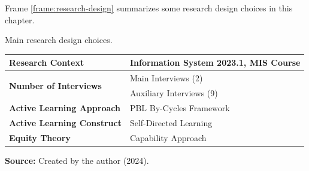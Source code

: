 Frame \ref{frame:research-design} summarizes some research design choices in this chapter.

\begin{quadro}
\caption{Main research design choices.}
\label{frame:research-design}
\centering
\begin{tabular}{|l|l|}
\cline{1-2}

\textbf{Research Context} & 
Information System 2023.1, \gls{MIS} Course \\
\hline

\multirow{2}{*}{\textbf{Number of Interviews}} &
 Main Interviews (2)\\
 & Auxiliary Interviews (9)\\
 \hline
 \textbf{Active Learning Approach} &
 PBL By-Cycles Framework \cite{alexandre:2018}\\
 \hline
 \textbf{Active Learning Construct} &
 Self-Directed Learning \cite{knowles:1975,grow:1991}\\
 \hline
 \textbf{Equity Theory} &
 Capability Approach \cite{sen:1992}\\
\hline

\end{tabular}
  \par\medskip\ABNTEXfontereduzida\selectfont\textbf{Source:} Created by the author (2024). \par\medskip
\end{quadro}

                

        
